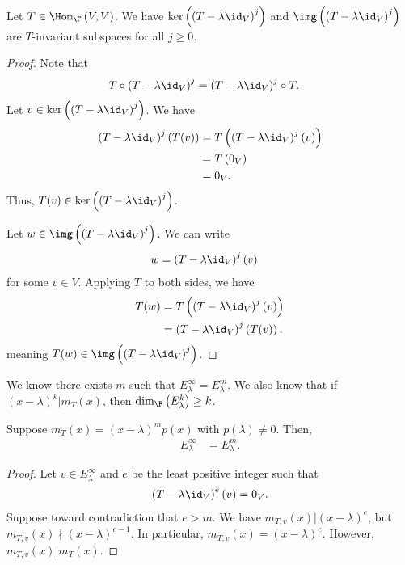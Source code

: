 \documentclass[10pt]{mypackage}
\begin{document}
\begin{lemma}
  Let $T\in \Hom_{\F}\left(V,V\right)$. We have $\ker\left(\left(T-\lambda \id_V\right)^j\right)$ and $\img\left(\left(T-\lambda \id_V\right)^j\right)$ are $T$-invariant subspaces for all $j\geq 0$.
\end{lemma}
\begin{proof}
  Note that
  \begin{align*}
    T\circ \left(T - \lambda\id_{V}\right)^j &= \left(T - \lambda\id_{V}\right)^j\circ T.
  \end{align*}
  Let $v\in \ker\left(\left(T-\lambda \id_V\right)^j\right)$. We have
  \begin{align*}
    \left(T-\lambda\id_V\right)^j\left(T(v)\right) &= T\left(\left(T-\lambda\id_V\right)^j(v)\right)\\
                                                   &= T\left(0_V\right)\\
                                                   &= 0_V.
  \end{align*}
  Thus, $T(v)\in \ker\left(\left(T-\lambda\id_V\right)^j\right)$.\newline

  Let $w\in \img\left(\left(T-\lambda\id_V\right)^j\right)$. We can write
  \begin{align*}
    w &= \left(T-\lambda\id_V\right)^j(v)
  \end{align*}
  for some $v\in V$. Applying $T$ to both sides, we have
  \begin{align*}
    T(w) &= T\left(\left(T-\lambda\id_V\right)^j(v)\right)\\
         &= \left(T-\lambda\id_V\right)^j\left(T(v)\right),
  \end{align*}
  meaning $T(w)\in \img\left(\left(T-\lambda\id_V\right)^j\right)$.
\end{proof}
We know there exists $m$ such that $E_{\lambda}^{\infty} = E_{\lambda}^{m}$. We also know that if $\left(x-\lambda\right)^k|m_T(x)$, then $\dim_{\F}\left(E_{\lambda}^{k}\right)\geq k$.
\begin{lemma}
  Suppose $m_T(x) = \left(x-\lambda\right)^mp(x)$ with $p\left(\lambda\right)\neq 0$. Then,
  \begin{align*}
    E_{\lambda}^{\infty} &= E_{\lambda}^{m}.
  \end{align*}
\end{lemma}
\begin{proof}
  Let $v\in E_{\lambda}^{\infty}$ and $e$ be the least positive integer such that 
  \begin{align*}
    \left(T-\lambda\id_V\right)^{e}\left(v\right) = 0_V.
  \end{align*}
  Suppose toward contradiction that $e > m$. We have $m_{T,v}(x) | \left(x-\lambda\right)^e$, but $m_{T,v}\left(x\right) \nmid \left(x-\lambda\right)^{e-1}$. In particular, $m_{T,v}(x) = \left(x-\lambda\right)^{e}$. However, $m_{T,v}(x) | m_{T}(x)$.
\end{proof}
\end{document}
